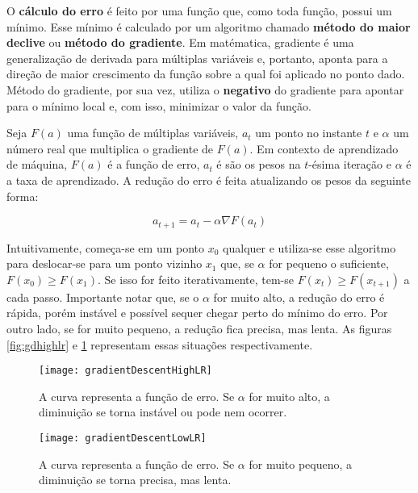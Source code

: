 O \textbf{cálculo do erro} é feito por uma função que, como toda função, possui um mínimo.
Esse mínimo é calculado por um algoritmo chamado \textbf{método do maior declive} ou \textbf{método do gradiente}.
Em matématica, gradiente é uma generalização de derivada para múltiplas variáveis e, portanto, aponta para a direção de maior crescimento da função sobre a qual foi aplicado no ponto dado.
Método do gradiente, por sua vez, utiliza o \textbf{negativo} do gradiente para apontar para o mínimo local e, com isso, minimizar o valor da função.

Seja $F(a)$ uma função de múltiplas variáveis, $a_{t}$ um ponto no instante $t$ e $\alpha$ um número real que multiplica o gradiente de $F(a)$.
Em contexto de aprendizado de máquina, $F(a)$ é a função de erro, $a_{t}$ é são os pesos na $t$-ésima iteração e $\alpha$ é a taxa de aprendizado.
A redução do erro é feita atualizando os pesos da seguinte forma:

\begin{equation} \label{eq:w_update}
a_{t+1} = a_{t} - \alpha \nabla F(a_{t})
\end{equation}

Intuitivamente, começa-se em um ponto $x_{0}$ qualquer e utiliza-se esse algoritmo para deslocar-se para um ponto vizinho $x_{1}$ que, se $\alpha$ for pequeno o suficiente, $F(x_{0}) \geq F(x_{1})$.
Se isso for feito iterativamente, tem-se $F(x_{t}) \geq F(x_{t+1})$ a cada passo.
Importante notar que, se o $\alpha$ for muito alto, a redução do erro é rápida, porém instável e  possível sequer chegar perto do mínimo do erro.
Por outro lado, se for muito pequeno, a redução fica precisa, mas lenta.
As figuras \ref{fig:gdhighlr} e \ref{fig:gdlowlr} representam essas situações respectivamente.

\begin{figure}[h!]
  \label{fig:gradientDescent}
  \begin{minipage}[b]{.5\textwidth}
  \centering
  \texttt{[image: gradientDescentHighLR]}
  \caption{A curva representa a função de erro. Se $\alpha$ for muito alto, a diminuição se torna instável ou pode nem ocorrer.}
  \label{fig:gdhighlr}
  \end{minipage}
  \hfill
  \begin{minipage}[b]{.5\textwidth}
  \centering
  \texttt{[image: gradientDescentLowLR]}
  \caption{A curva representa a função de erro. Se $\alpha$ for muito pequeno, a diminuição se torna precisa, mas lenta.}
  \label{fig:gdlowlr}
  \end{minipage}
\end{figure}



